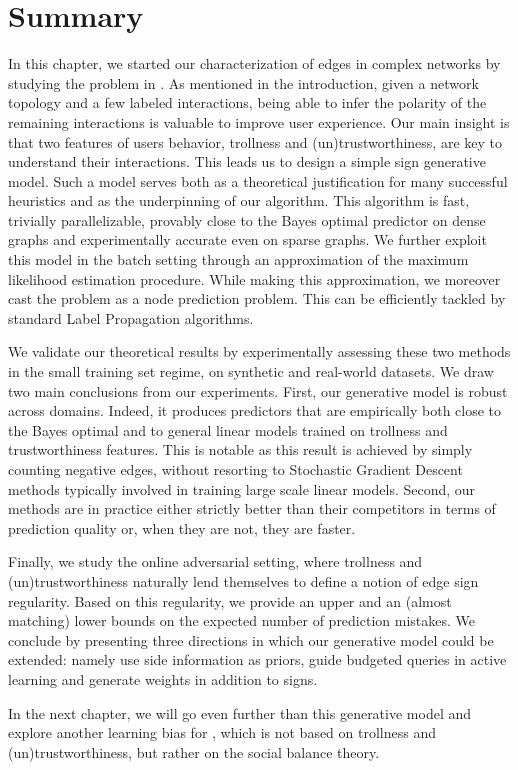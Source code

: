 \section{Summary}

In this chapter, we started our characterization of edges in complex networks by studying the \esp{}
problem in \dssn{}. As mentioned in the introduction, given a network topology and a few labeled
interactions, being able to infer the polarity of the remaining interactions is valuable to improve
user experience. Our main insight is that two features of users behavior, trollness and
(un)trustworthiness, are key to understand their interactions. This leads us to design a simple sign
generative model. Such a model serves both as a theoretical justification for many successful
heuristics and as the underpinning of our \usrule{} algorithm. This algorithm is fast, trivially
parallelizable, provably close to the Bayes optimal predictor on dense graphs and experimentally
accurate even on sparse graphs. We further exploit this model in the batch setting through an
approximation of the maximum likelihood estimation procedure. While making this approximation, we
moreover cast the problem as a node prediction problem. This can be efficiently tackled by standard
Label Propagation algorithms.

We validate our theoretical results by experimentally assessing these two methods in the small
training set regime, on synthetic and real-world datasets. We draw two main conclusions from our
experiments. First, our generative model is robust across domains. Indeed, it produces predictors
that are empirically both close to the Bayes optimal and to general linear models trained on
trollness and trustworthiness features. This is notable as this result is achieved by simply
counting negative edges, without resorting to Stochastic Gradient Descent methods typically involved
in training large scale linear models. Second, our methods are in practice either strictly better
than their competitors in terms of prediction quality or, when they are not, they are faster.

Finally, we study the online adversarial setting, where trollness and (un)trustworthiness naturally
lend themselves to define a notion of edge sign regularity. Based on this regularity, we provide an
upper and an (almost matching) lower bounds on the expected number of prediction mistakes. We
conclude by presenting three directions in which our generative model could be extended: namely
use side information as priors, guide budgeted queries in active learning and generate weights in
addition to signs.

In the next chapter, we will go even further than this generative model and explore another learning
bias for \esp{}, which is not based on trollness and (un)trustworthiness, but rather on the social
balance theory.
